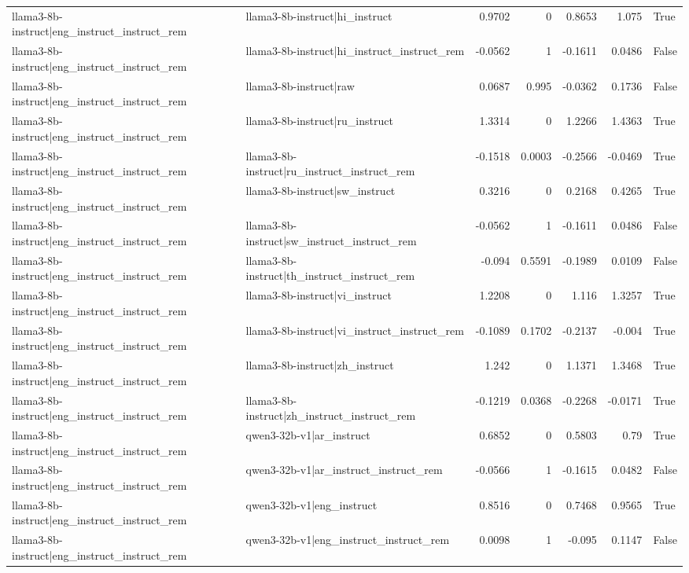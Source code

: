 \begin{table}
\begin{tabular}{l l r r r r l}
llama3-8b-instruct|eng_instruct_instruct_rem & llama3-8b-instruct|hi_instruct & 0.9702 & 0 & 0.8653 & 1.075 & True \\
llama3-8b-instruct|eng_instruct_instruct_rem & llama3-8b-instruct|hi_instruct_instruct_rem & -0.0562 & 1 & -0.1611 & 0.0486 & False \\
llama3-8b-instruct|eng_instruct_instruct_rem & llama3-8b-instruct|raw & 0.0687 & 0.995 & -0.0362 & 0.1736 & False \\
llama3-8b-instruct|eng_instruct_instruct_rem & llama3-8b-instruct|ru_instruct & 1.3314 & 0 & 1.2266 & 1.4363 & True \\
llama3-8b-instruct|eng_instruct_instruct_rem & llama3-8b-instruct|ru_instruct_instruct_rem & -0.1518 & 0.0003 & -0.2566 & -0.0469 & True \\
llama3-8b-instruct|eng_instruct_instruct_rem & llama3-8b-instruct|sw_instruct & 0.3216 & 0 & 0.2168 & 0.4265 & True \\
llama3-8b-instruct|eng_instruct_instruct_rem & llama3-8b-instruct|sw_instruct_instruct_rem & -0.0562 & 1 & -0.1611 & 0.0486 & False \\
llama3-8b-instruct|eng_instruct_instruct_rem & llama3-8b-instruct|th_instruct_instruct_rem & -0.094 & 0.5591 & -0.1989 & 0.0109 & False \\
llama3-8b-instruct|eng_instruct_instruct_rem & llama3-8b-instruct|vi_instruct & 1.2208 & 0 & 1.116 & 1.3257 & True \\
llama3-8b-instruct|eng_instruct_instruct_rem & llama3-8b-instruct|vi_instruct_instruct_rem & -0.1089 & 0.1702 & -0.2137 & -0.004 & True \\
llama3-8b-instruct|eng_instruct_instruct_rem & llama3-8b-instruct|zh_instruct & 1.242 & 0 & 1.1371 & 1.3468 & True \\
llama3-8b-instruct|eng_instruct_instruct_rem & llama3-8b-instruct|zh_instruct_instruct_rem & -0.1219 & 0.0368 & -0.2268 & -0.0171 & True \\
llama3-8b-instruct|eng_instruct_instruct_rem & qwen3-32b-v1|ar_instruct & 0.6852 & 0 & 0.5803 & 0.79 & True \\
llama3-8b-instruct|eng_instruct_instruct_rem & qwen3-32b-v1|ar_instruct_instruct_rem & -0.0566 & 1 & -0.1615 & 0.0482 & False \\
llama3-8b-instruct|eng_instruct_instruct_rem & qwen3-32b-v1|eng_instruct & 0.8516 & 0 & 0.7468 & 0.9565 & True \\
llama3-8b-instruct|eng_instruct_instruct_rem & qwen3-32b-v1|eng_instruct_instruct_rem & 0.0098 & 1 & -0.095 & 0.1147 & False \\

\end{tabular}
\end{table}

